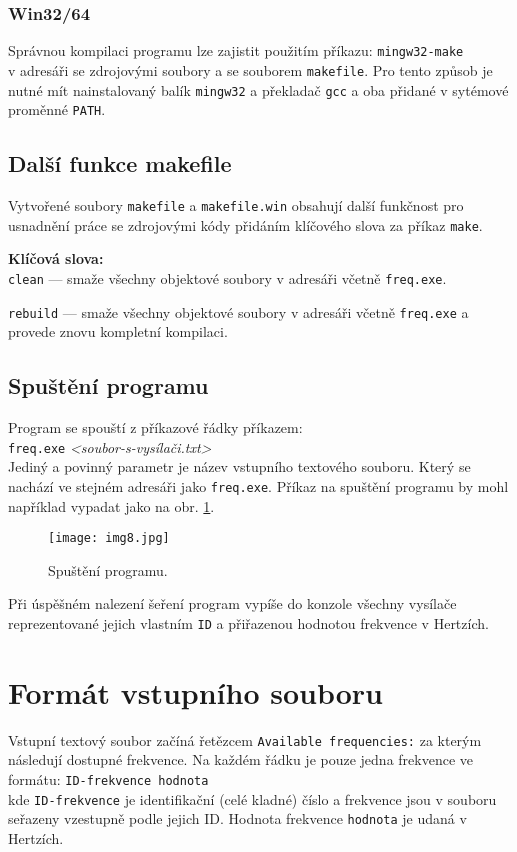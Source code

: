 \documentclass[12pt]{report}
\begin{document}
\subsubsection{Win32/64}
Správnou kompilaci programu lze zajistit použitím příkazu:  \texttt{mingw32-make} 
\\v adresáři se zdrojovými soubory a se souborem \texttt{makefile}. Pro tento způsob je nutné mít nainstalovaný balík \texttt{mingw32} a překladač \texttt{gcc} a oba přidané v sytémové proměnné \texttt{PATH}.

\subsection{Další funkce makefile}
Vytvořené soubory \texttt{makefile} a \texttt{makefile.win} obsahují další funkčnost pro usnadnění práce se zdrojovými kódy přidáním klíčového slova za příkaz \texttt{make}.

\textbf{Klíčová slova:}\\
\texttt{clean} --- smaže všechny objektové soubory v adresáři včetně \texttt{freq.exe}.

\texttt{rebuild} --- smaže všechny objektové soubory v adresáři včetně \texttt{freq.exe} a provede znovu kompletní kompilaci.

\subsection{Spuštění programu}
Program se spouští z příkazové řádky příkazem: \\
\texttt{freq.exe} \textit{\textless soubor-s-vysílači.txt\textgreater}\\
Jediný a povinný parametr je název vstupního textového souboru. Který se nachází ve stejném adresáři jako \texttt{freq.exe}.
Příkaz na spuštění programu by mohl například vypadat jako na obr. \ref{obr8}.

\begin{figure}[h]
\texttt{[image: img8.jpg]}
\caption{Spuštění programu.}
\label{obr8}
\end{figure}

Při úspěšném nalezení šeření program vypíše do konzole všechny vysílače reprezentované jejich vlastním \texttt{ID} a přiřazenou hodnotou frekvence v Hertzích.

\section{Formát vstupního souboru}\label{format_vst_souboru}
Vstupní textový soubor začíná řetězcem \texttt{Available frequencies:} za kterým následují dostupné frekvence. Na každém řádku je pouze jedna frekvence ve formátu: \texttt{ID-frekvence hodnota}\\
kde \texttt{ID-frekvence} je identifikační (celé kladné) číslo a frekvence jsou v souboru seřazeny vzestupně podle jejich ID. Hodnota frekvence \texttt{hodnota} je udaná v Hertzích.
\end{document}
